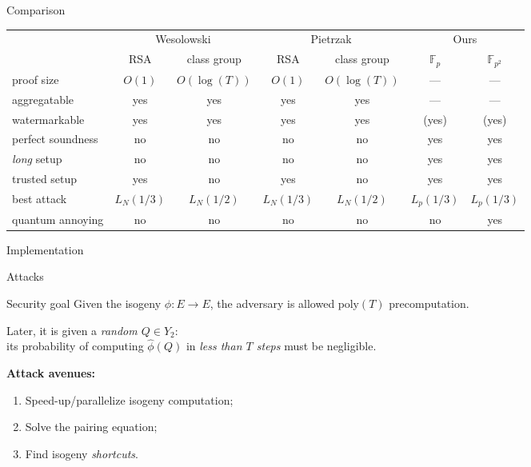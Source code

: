\documentclass[aspectratio=169]{beamer}
\newcommand{\F}{\mathbb{F}}
\begin{document}
\begin{frame}{Comparison}
  \begin{tabular}{l | c c | c c | c c}
    & \multicolumn{2}{c|}{Wesolowski} & \multicolumn{2}{c|}{Pietrzak} & \multicolumn{2}{c}{Ours}\\
    & RSA & class group & RSA & class group & $\F_p$ & $\F_{p^2}$\\
    \hline
    proof size    & $O(1)$ & $O(\log(T))$ & $O(1)$ & $O(\log(T))$ & --- & ---\\
    aggregatable  & yes & yes & yes & yes & --- & ---\\
    watermarkable & yes & yes & yes & yes & (yes) & (yes)\\
    perfect soundness & no & no & no & no & yes & yes\\
    \textit{long} setup & no & no & no & no & \alert{yes} & \alert{yes}\\
    trusted setup & \alert{yes} & no & \alert{yes} & no & \alert{yes} & \alert{yes}\\
    best attack   & $L_N(1/3)$ & $L_N(1/2)$ & $L_N(1/3)$ & $L_N(1/2)$ & $L_p(1/3)$ & $L_p(1/3)$\\
    quantum annoying & no & no & no & no & no & yes\\
  \end{tabular}
\end{frame}


\begin{frame}{Implementation}
  
\end{frame}


\begin{frame}{Attacks}
  \begin{block}{Security goal}
    Given the isogeny \emph{$\phi:E\to E$}, the adversary is allowed
    $\mathrm{poly}(T)$ precomputation.

    \smallskip
    Later, it is given a \emph{random $Q\in Y_2$}:\\
    its probability of computing \emph{$\hat\phi(Q)$} in \emph{less
      than $T$ steps} must be negligible.
  \end{block}

  \textbf{Attack avenues:}
  \begin{enumerate}
  \item Speed-up/parallelize isogeny computation;
  \item Solve the pairing equation;
  \item Find isogeny \textit{shortcuts}.
  \end{enumerate}
\end{frame}
\end{document}
